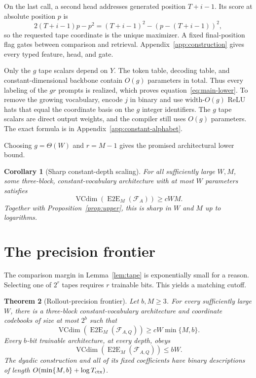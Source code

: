 \documentclass{article}
\newtheorem{theorem}{Theorem}
\newtheorem{corollary}[theorem]{Corollary}
\newcommand{\1}{\mathbf 1}
\newcommand{\VC}{\operatorname{VCdim}}
\newcommand{\EtoE}{\operatorname{E2E}}
\begin{document}
On the last call, a second head addresses generated position $T+i-1$. Its score at absolute position $p$ is
\begin{equation}
 2(T+i-1)p-p^2=(T+i-1)^2-(p-(T+i-1))^2,
 \label{eq:address-score}
\end{equation}
so the requested tape coordinate is the unique maximizer. A fixed final-position flag gates between comparison and retrieval. Appendix~\ref{app:construction} gives every typed feature, head, and gate.

Only the $g$ tape scalars depend on $Y$. The token table, decoding table, and constant-dimensional backbone contain $O(g)$ parameters in total. Thus every labeling of the $gr$ prompts is realized, which proves equation~\eqref{eq:main-lower}. To remove the growing vocabulary, encode $j$ in binary and use width-$O(g)$ ReLU hats that equal the coordinate basis on the $g$ integer identifiers. The $g$ tape scalars are direct output weights, and the compiler still uses $O(g)$ parameters. The exact formula is in Appendix~\ref{app:constant-alphabet}.

Choosing $g=\Theta(W)$ and $r=M-1$ gives the promised architectural lower bound.

\begin{corollary}[Sharp constant-depth scaling]\label{cor:sharp}
For all sufficiently large $W,M$, some three-block, constant-vocabulary architecture with at most $W$ parameters satisfies \[ \VC(\EtoE_M(\mathcal F_A))\geq cWM. \] Together with Proposition~\ref{prop:upper}, this is sharp in $W$ and $M$ up to logarithms.
\end{corollary}

\section{The precision frontier}

The comparison margin in Lemma~\ref{lem:tape} is exponentially small for a reason. Selecting one of $2^r$ tapes requires $r$ trainable bits. This yields a matching cutoff.

\begin{theorem}[Rollout-precision frontier]\label{thm:precision}
Let $b,M\geq3$. For every sufficiently large $W$, there is a three-block constant-vocabulary architecture and coordinate codebooks of size at most $2^b$ such that
\begin{equation}
 \VC(\EtoE_M(\mathcal F_{A,Q}))
 \geq cW\min\{M,b\}.
 \label{eq:precision-lower}
\end{equation}
Every $b$-bit trainable architecture, at every depth, obeys
\begin{equation}
 \VC(\EtoE_M(\mathcal F_{A,Q}))\leq bW.
 \label{eq:precision-upper}
\end{equation}
The dyadic construction and all of its fixed coefficients have binary descriptions of length $O(\min\{M,b\}+\log T_{\rm ctx})$.
\end{theorem}
\end{document}
